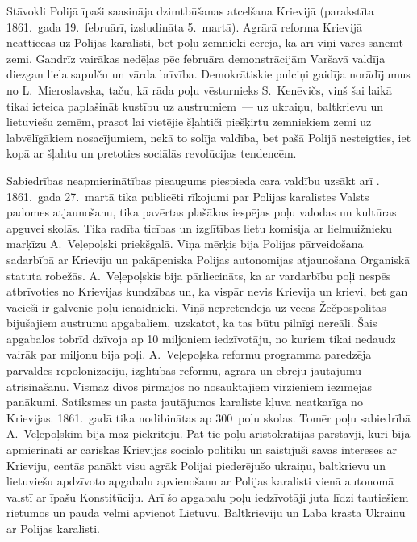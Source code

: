 \documentclass[twoside,a5paper,12pt,fleqn,openany]{extbook}
\begin{document}
Stāvokli Polijā īpaši saasināja dzimtbūšanas atcelšana Krievijā (parakstīta 1861.~gada 19.~februārī, izsludināta 5.~martā). Agrārā reforma Krievijā neattiecās uz Polijas karalisti, bet poļu zemnieki cerēja, ka arī viņi varēs saņemt zemi. Gandrīz vairākas nedēļas pēc februāra demonstrācijām Varšavā valdīja diezgan liela sapulču un vārda brīvība. Demokrātiskie pulciņi gaidīja norādījumus no L.~Mieroslavska, taču, kā rāda poļu vēsturnieks S.~Keņēvičs, viņš šai laikā tikai ieteica paplašināt kustību uz austrumiem~--- uz ukraiņu, baltkrievu un lietuviešu zemēm, prasot lai vietējie šļahtiči piešķirtu zemniekiem zemi uz labvēlīgākiem nosacījumiem, nekā to solīja valdība, bet pašā Polijā nesteigties, iet kopā ar šļahtu un pretoties sociālās revolūcijas tendencēm.

Sabiedrības neapmierinātības pieaugums piespieda cara valdību uzsākt  arī . 1861.~gada 27.~martā tika publicēti rīkojumi par Polijas karalistes Valsts padomes atjaunošanu, tika pavērtas plašākas iespējas poļu valodas un kultūras apguvei skolās. Tika radīta ticības un izglītības lietu komisija ar lielmuižnieku marķīzu A.~Veļepoļski priekšgalā. Viņa mērķis bija Polijas pārveidošana sadarbībā ar Krieviju un pakāpeniska Polijas autonomijas atjaunošana Organiskā statuta robežās. A.~Veļepoļskis bija pārliecināts, ka ar vardarbību poļi nespēs atbrīvoties no Krievijas kundzības un, ka vispār nevis Krievija un krievi, bet gan vācieši ir galvenie poļu ienaidnieki. Viņš nepretendēja uz vecās Žečpospolitas bijušajiem austrumu apgabaliem, uzskatot, ka tas būtu pilnīgi nereāli. Šais apgabalos tobrīd dzīvoja ap 10 miljoniem iedzīvotāju, no kuriem tikai nedaudz vairāk par miljonu bija poļi. A.~Veļepoļska reformu programma paredzēja pārvaldes repolonizāciju, izglītības reformu, agrārā un ebreju jautājumu atrisināšanu. Vismaz divos pirmajos no nosauktajiem virzieniem iezīmējās panākumi. Satiksmes un pasta jautājumos karaliste kļuva neatkarīga no Krievijas. 1861.~gadā tika nodibinātas ap 300~poļu skolas. Tomēr poļu sabiedrībā A.~Veļepoļskim bija maz piekritēju. Pat tie poļu aristokrātijas pārstāvji, kuri bija apmierināti ar cariskās Krievijas sociālo politiku un saistījuši savas intereses ar Krieviju, centās panākt visu agrāk Polijai piederējušo ukraiņu, baltkrievu un lietuviešu apdzīvoto apgabalu apvienošanu ar Polijas karalisti vienā autonomā valstī ar īpašu Konstitūciju. Arī šo apgabalu poļu iedzīvotāji juta līdzi tautiešiem rietumos un pauda vēlmi apvienot Lietuvu, Baltkrieviju un Labā krasta Ukrainu ar Polijas karalisti.
\end{document}
